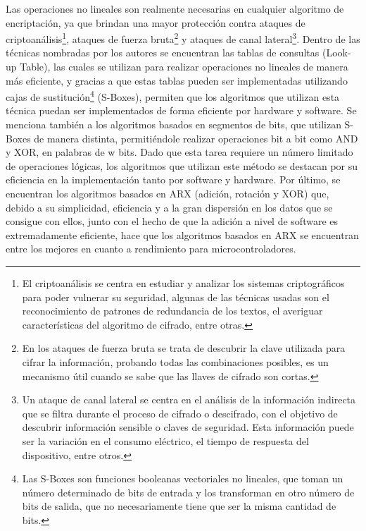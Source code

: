 \documentclass[a4paper,10pt]{article}
\begin{document}
	Las operaciones no lineales son realmente necesarias en cualquier algoritmo de encriptación, ya que brindan una mayor protección contra ataques de criptoanálisis\footnote{El criptoanálisis se centra en estudiar y analizar los sistemas criptográficos para poder vulnerar su seguridad, algunas de las técnicas usadas son el reconocimiento de patrones de redundancia de los textos, el averiguar características del algoritmo de cifrado, entre otras.}, ataques de fuerza bruta\footnote{En los ataques de fuerza bruta se trata de descubrir la clave utilizada para cifrar la información, probando todas las combinaciones posibles, es un mecanismo útil cuando se sabe que las llaves de cifrado son cortas.} y ataques de canal lateral\footnote{Un ataque de canal lateral se centra en el análisis de la información indirecta que se filtra durante el proceso de cifrado o descifrado, con el objetivo de descubrir información sensible o claves de seguridad. Esta información puede ser la variación en el consumo eléctrico, el tiempo de respuesta del dispositivo, entre otros.}. Dentro de las técnicas nombradas por los autores se encuentran las tablas de consultas (Look-up Table), las cuales se utilizan para realizar operaciones no lineales de manera más eficiente, y gracias a que estas tablas pueden ser implementadas utilizando cajas de sustitución\footnote{Las S-Boxes son funciones booleanas vectoriales no lineales, que toman un número determinado de bits de entrada y los transforman en otro número de bits de salida, que no necesariamente tiene que ser la misma cantidad de bits.} (S-Boxes), permiten que los algoritmos que utilizan esta técnica puedan ser implementados de forma eficiente por hardware y software. Se menciona también a los algoritmos basados en segmentos de bits, que utilizan S-Boxes de manera distinta, permitiéndole realizar operaciones bit a bit como AND y XOR, en palabras de w bits. Dado que esta tarea requiere un número limitado de operaciones lógicas, los algoritmos que utilizan este método se destacan por su eficiencia en la implementación tanto por software y hardware. Por último, se encuentran los algoritmos basados en ARX (adición, rotación y XOR) que, debido a su simplicidad, eficiencia y a la gran dispersión en los datos que se consigue con ellos, junto con el hecho de que la adición a nivel de software es extremadamente eficiente, hace que los algoritmos basados en ARX se encuentran entre los mejores en cuanto a rendimiento para microcontroladores.
	
\end{document}
